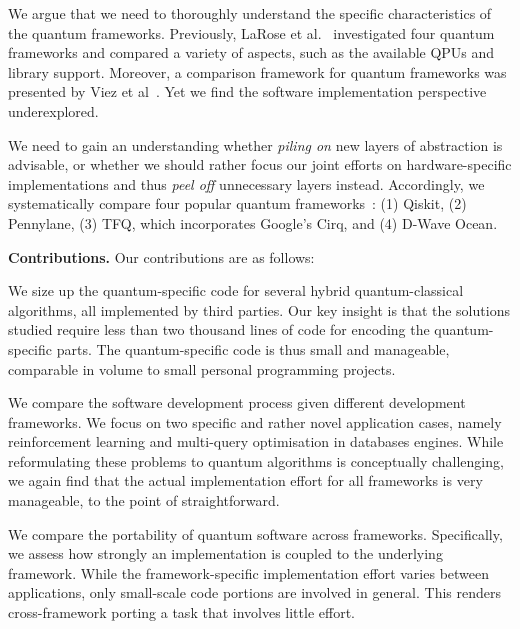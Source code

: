 \documentclass[conference]{IEEEtran}
\begin{document}
We argue that we need to thoroughly understand the specific characteristics of the quantum frameworks. Previously, LaRose et al.~\cite{LaRose.2019} investigated four quantum frameworks and compared a variety of aspects, such as the available QPUs and library support. Moreover, a comparison framework for quantum frameworks was presented by Viez et al~\cite{Vietz.2021}. Yet we find the software implementation perspective underexplored.

We need to gain an understanding whether \emph{piling on} new layers of
abstraction is advisable, or whether we should rather focus our joint efforts on
hardware-specific implementations and thus \emph{peel off} unnecessary layers
instead. Accordingly, we systematically compare four popular quantum
frameworks~\cite{OwenLockwood.2020, Chen.2020,
Skolik.28.03.2021, franz22, Trummer.2016, Feld.2019, Khairy.2019}: (1) Qiskit, (2)
Pennylane, (3) TFQ, which incorporates Google's Cirq, and (4) D-Wave Ocean. 

\smallskip
\noindent
\textbf{Contributions.}
Our contributions are as follows: 
\begin{compactitem}
    \item We size up the quantum-specific code for several hybrid quantum-classical algorithms, all implemented by third parties. Our key insight is that the solutions studied require less than two thousand lines of code for encoding the quantum-specific parts. The quantum-specific code is thus small and manageable, comparable in volume to small personal programming projects. 
    \item  We compare the software development process given different development frameworks.
    We focus on two specific and rather novel application cases, namely reinforcement learning and  multi-query optimisation in databases engines. While reformulating these problems to quantum algorithms is conceptually challenging, we again find that the actual implementation effort for all frameworks is very manageable,
    to the point of straightforward.
    \item We compare the portability of quantum software across frameworks. Specifically,
    we assess how strongly an implementation is coupled to the underlying framework. While the
    framework-specific implementation effort varies between applications, only small-scale code
    portions are involved in general. This renders cross-framework porting a task that involves little effort.
\end{compactitem}
\end{document}
